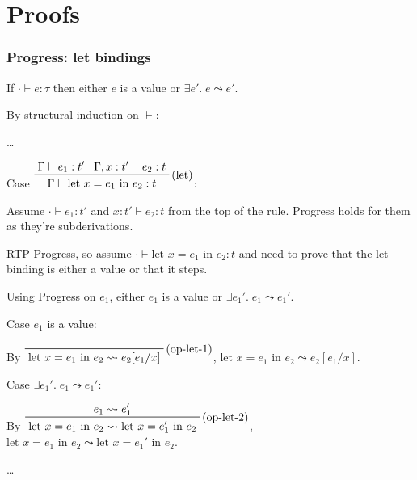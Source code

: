 \documentclass[11pt]{article}
\begin{document}
\section{Proofs}
{
    \subsubsection*{Progress: let bindings}
    {
        If \(\cdot \vdash e : \tau\) then either \(e\) is a value or \(\exists e'.\; e \leadsto e'\).

        By structural induction on \(\vdash\):

        \begin{adjustwidth}{5mm}{0mm}
            \dots
    
            Case \(\prftree[r]{(let)}{\Gamma\vdash e_1 : t'}{\Gamma,x:t'\vdash e_2 : t}{\Gamma\vdash \text{let }x =
            e_1 \text{ in } e_2 : t}\):

            \begin{adjustwidth}{5mm}{0mm}
                Assume \(\cdot\vdash e_1 : t'\) and \(x:t' \vdash e_2 : t\) from the top of the rule. Progress holds for
                them as they're subderivations.

                RTP Progress, so assume \(\cdot \vdash \text{let }x = e_1 \text{ in } e_2 : t\) and need to prove that
                the let-binding is either a value or that it steps.
                
                Using Progress on \(e_1\), either \(e_1\) is a value or \(\exists e_1'.\; e_1 \leadsto e_1'\).

                Case \(e_1\) is a value:
                \begin{adjustwidth}{5mm}{0mm}
                    By \(\prftree[r]{(op-let-1)}{\text{let }x = e_1 \text{ in } e_2 \leadsto e_2[e_1/x]}\), \(\text{let
                    }x = e_1 \text{ in } e_2 \leadsto e_2[e_1/x]\).
                \end{adjustwidth}

                Case \(\exists e_1'.\;e_1 \leadsto e_1'\):
                \begin{adjustwidth}{5mm}{0mm}
                    By \(\prftree[r]{(op-let-2)}{e_1 \leadsto e_1'}{\text{let }x = e_1 \text{ in } e_2 \leadsto
                    \text{let }x = e_1' \text{ in } e_2}\), \(\text{let }x = e_1 \text{ in } e_2 \leadsto \text{let }x =
                    e_1' \text{ in } e_2\).
                \end{adjustwidth}
            \end{adjustwidth}

            \dots
        \end{adjustwidth}
    }
}
\end{document}
